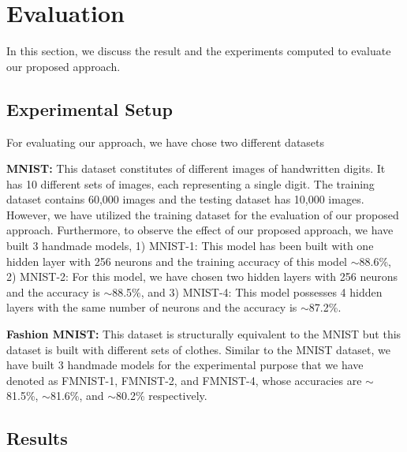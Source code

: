\section{Evaluation}
\label{sec:evaluation}
In this section, we discuss the result and the experiments computed to evaluate our proposed approach.
\subsection{Experimental Setup}
For evaluating our approach, we have chose two different datasets

\textbf{MNIST:}
This dataset \cite{lecun1998gradient} constitutes of different images of handwritten digits. It has 10 different sets of images, each representing a single digit. The training dataset contains 60,000 images and the testing dataset has 10,000 images. However, we have utilized the training dataset for the evaluation of our proposed approach. Furthermore, to observe the effect of our proposed approach, we have built 3 handmade models, 1) MNIST-1: This model has been built with one hidden layer with 256 neurons and the training accuracy of this model $\sim$88.6\%, 2) MNIST-2: For this model, we have chosen two hidden layers with 256 neurons and the accuracy is $\sim$88.5\%, and 3) MNIST-4: This model possesses 4 hidden layers with the same number of neurons and the accuracy is $\sim$87.2\%.

\textbf{Fashion MNIST:}
This dataset \cite{xiao2017fashion} is structurally equivalent to the MNIST but this dataset is built with different sets of clothes. Similar to the MNIST dataset, we have built 3 handmade models for the experimental purpose that we have denoted as FMNIST-1, FMNIST-2, and FMNIST-4, whose accuracies are $\sim$81.5\%, $\sim$81.6\%, and $\sim$80.2\% respectively.
\subsection{Results}
